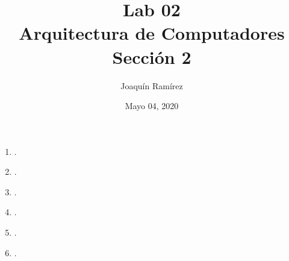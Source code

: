\documentclass[11pt,a4paper]{article}
\title{Lab 02\\Arquitectura de Computadores \\ \Large{Sección 2}}
\author{Joaquín Ramírez}
\date{Mayo 04, 2020}
\begin{document}
\maketitle
\begin{enumerate}
\item .
\item .
\item .
\item .
\item .
\item .


\end{enumerate}
\end{document}
